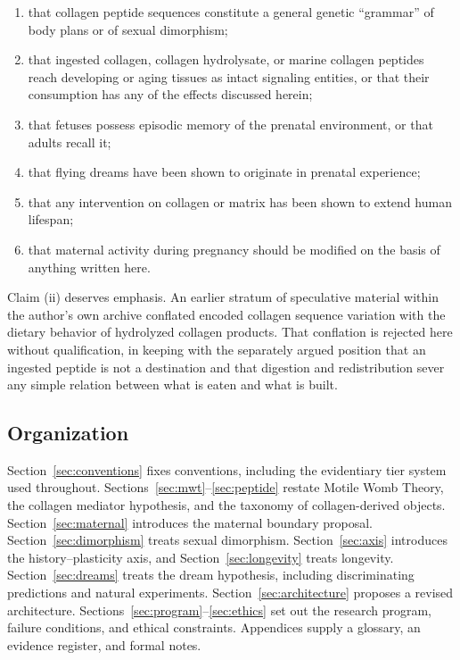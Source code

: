 \documentclass[11pt,a4paper]{article}
\theoremstyle{plain}
\theoremstyle{definition}
\theoremstyle{remark}
\begin{document}
\begin{enumerate}[label=(\roman*),itemsep=2pt]
\item that collagen peptide sequences constitute a general genetic ``grammar'' of body plans or of sexual dimorphism;
\item that ingested collagen, collagen hydrolysate, or marine collagen peptides reach developing or aging tissues as intact signaling entities, or that their consumption has any of the effects discussed herein;
\item that fetuses possess episodic memory of the prenatal environment, or that adults recall it;
\item that flying dreams have been shown to originate in prenatal experience;
\item that any intervention on collagen or matrix has been shown to extend human lifespan;
\item that maternal activity during pregnancy should be modified on the basis of anything written here.
\end{enumerate}

Claim (ii) deserves emphasis. An earlier stratum of speculative material within the author's own archive conflated encoded collagen sequence variation with the dietary behavior of hydrolyzed collagen products. That conflation is rejected here without qualification, in keeping with the separately argued position that an ingested peptide is not a destination and that digestion and redistribution sever any simple relation between what is eaten and what is built.

\subsection{Organization}

Section~\ref{sec:conventions} fixes conventions, including the evidentiary tier system used throughout. Sections~\ref{sec:mwt}--\ref{sec:peptide} restate Motile Womb Theory, the collagen mediator hypothesis, and the taxonomy of collagen-derived objects. Section~\ref{sec:maternal} introduces the maternal boundary proposal. Section~\ref{sec:dimorphism} treats sexual dimorphism. Section~\ref{sec:axis} introduces the history--plasticity axis, and Section~\ref{sec:longevity} treats longevity. Section~\ref{sec:dreams} treats the dream hypothesis, including discriminating predictions and natural experiments. Section~\ref{sec:architecture} proposes a revised architecture. Sections~\ref{sec:program}--\ref{sec:ethics} set out the research program, failure conditions, and ethical constraints. Appendices supply a glossary, an evidence register, and formal notes.
\end{document}
